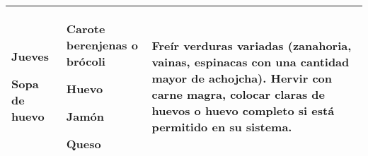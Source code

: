 \documentclass[menu.tex]{subfiles}
\begin{document}
\begin{tabular} {p{3cm} p{4.5cm} p{9cm}}
\pbox{20cm}
{
    \rule{0pt}{3ex}\begin{large}\textbf{Jueves}\end{large}\\
    \rule{0pt}{2ex}Sopa de huevo
} & 
\vspace{-0.4cm}
\begin{compactitem} 
    \begin{footnotesize}
        \item Carote berenjenas o brócoli
        \item Huevo
        \item Jamón
        \item Queso
    \end{footnotesize}
\end{compactitem}&
\vspace{-0.4cm}
Freír verduras variadas (zanahoria, vainas, espinacas con una cantidad mayor de achojcha). Hervir con carne magra, colocar claras de huevos o huevo completo si está permitido en su sistema.\\
\hline


\end{tabular}
\end{document}
